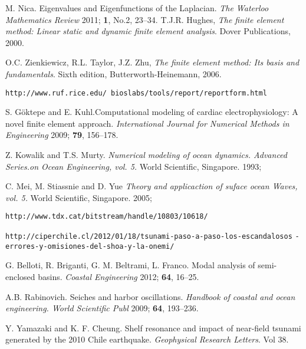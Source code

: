 \documentclass[12pt, letterpaper]{article}
\begin{document}
\begin{thebibliography}{10}

  M. Nica. Eigenvalues and Eigenfunctions of the Laplacian. \emph{The Waterloo Mathematics Review} 2011; {\bf 1}, No.2, 23--34.
  T.J.R. Hughes, \emph{The finite element method: Linear static and dynamic finite element analysis}. Dover Publications, 2000.
  
  O.C. Zienkiewicz, R.L. Taylor, J.Z. Zhu, \emph{The finite element method: Its basis and fundamentals}. Sixth edition, Butterworth-Heinemann, 2006.  

 {\tt http://www.ruf.rice.edu/~bioslabs/tools/report/reportform.html }

	S. G\"{o}ktepe and E. Kuhl.Computational modeling of cardiac electrophysiology: A novel finite element approach. \emph{International Journal for Numerical Methods in Engineering} 2009; {\bf 79}, 156--178.
	
	Z. Kowalik and T.S. Murty. \emph{Numerical modeling of ocean dynamics. Advanced Series.on Ocean Engineering, vol. 5. }World Scientific, Singapore. 1993; 
	
	C. Mei, M. Stiassnie and D. Yue \emph{Theory and applicaction of suface ocean Waves, vol. 5. }World Scientific, Singapore. 2005; 

 {\tt http://www.tdx.cat/bitstream/handle/10803/10618/}

 {\tt http://ciperchile.cl/2012/01/18/tsunami-paso-a-paso-los-escandalosos} {\tt-errores-y-omisiones-del-shoa-y-la-onemi/
}

	G. Belloti, R. Briganti, G. M. Beltrami, L. Franco. Modal analysis of semi-enclosed basins. \emph{Coastal Engineering} 2012; {\bf 64}, 16--25.

	A.B. Rabinovich. Seiches and harbor oscillations. \emph{Handbook of coastal and ocean engineering. World Scientific Publ} 2009; {\bf 64}, 193--236.

	Y. Yamazaki and K. F. Cheung. Shelf resonance and impact of near-field tsunami generated by the 2010 Chile earthquake. {\it Geophysical Research Letters}. Vol 38.


\end{thebibliography}
\end{document}
